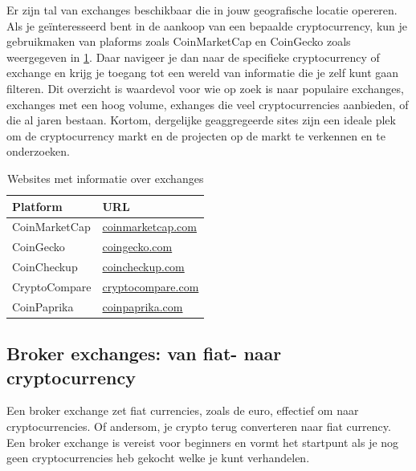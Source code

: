 Er zijn tal van exchanges beschikbaar die in jouw geografische locatie opereren. Als je ge{\"i}nteresseerd bent in de aankoop van een bepaalde cryptocurrency, kun je gebruikmaken van plaforms zoals CoinMarketCap en CoinGecko zoals weergegeven in \cref{tab:exchangeoverview}.
Daar navigeer je dan naar de specifieke cryptocurrency of exchange en krijg je toegang tot een wereld van informatie die je zelf kunt gaan filteren. Dit overzicht is waardevol voor wie op zoek is naar populaire exchanges, exchanges met een hoog volume, exhanges die veel cryptocurrencies aanbieden, of die al jaren bestaan. Kortom, dergelijke geaggregeerde sites zijn een ideale plek om de cryptocurrency markt en de projecten op de markt te verkennen en te onderzoeken.


\begin{table}

\centering

\caption{Websites met informatie over exchanges}
\begin{tabular}{ll} 
\toprule

\textbf{Platform} & \textbf{URL}\\
\midrule

CoinMarketCap   & \href{https://coinmarketcap.com}{coinmarketcap.com}      \\
CoinGecko       & \href{https://www.coingecko.com/en}{coingecko.com}    \\
CoinCheckup & \href{https://coincheckup.com}{coincheckup.com}    \\
CryptoCompare   & \href{https://www.cryptocompare.com}{cryptocompare.com}  \\
CoinPaprika      & \href{https://coinpaprika.com}{coinpaprika.com}         \\


\bottomrule
\end{tabular}
\label{tab:exchangeoverview}
\end{table}

\medskip

\subsection{Broker exchanges: van fiat- naar cryptocurrency}
\label{subsec:broker_exchange}

Een broker exchange zet fiat currencies, zoals de euro, effectief om naar cryptocurrencies. Of andersom, je crypto terug converteren naar fiat currency. Een broker exchange is vereist voor beginners en vormt het startpunt als je nog geen cryptocurrencies heb gekocht welke je kunt verhandelen. 

